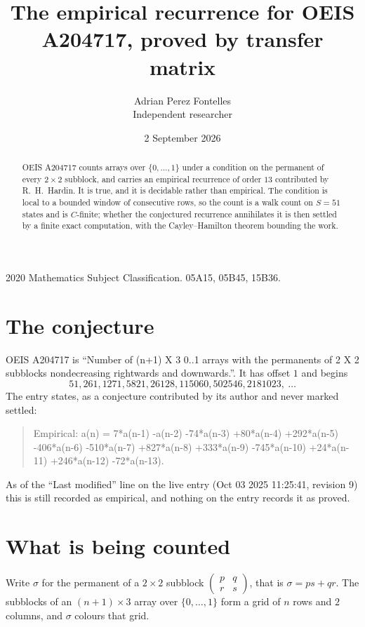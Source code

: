 \documentclass[11pt,a4paper]{article}
\title{The empirical recurrence for OEIS A204717, proved by transfer matrix}
\author{Adrian Perez Fontelles\\ \small Independent researcher}
\date{2 September 2026}
\theoremstyle{plain}
\theoremstyle{definition}
\begin{document}
\maketitle

\begin{abstract}
OEIS A204717 counts arrays over $\{0,\dots,1\}$ under a condition on the permanent of every
$2\times2$ subblock, and carries an empirical recurrence of order $13$ contributed by
R.~H.~Hardin. It is true, and it is decidable rather than empirical. The condition is local to
a bounded window of consecutive rows, so the count is a walk count on $S=51$ states and is
$C$-finite; whether the conjectured recurrence annihilates it is then settled by a finite exact
computation, with the Cayley--Hamilton theorem bounding the work.
\end{abstract}

\noindent\small 2020 Mathematics Subject Classification. 05A15, 05B45, 15B36.\normalsize

\section{The conjecture}

OEIS A204717 is ``Number of (n+1) X 3 0..1 arrays with the permanents of 2 X 2 subblocks nondecreasing rightwards and downwards.''. It has offset $1$ and begins
\[
51, 261, 1271, 5821, 26128, 115060, 502546, 2181023,\ \dots
\]
The entry states, as a conjecture contributed by its author and never marked settled:
\begin{quote}
Empirical: a(n) = 7*a(n-1) -a(n-2) -74*a(n-3) +80*a(n-4) +292*a(n-5) -406*a(n-6) -510*a(n-7) +827*a(n-8) +333*a(n-9) -745*a(n-10) +24*a(n-11) +246*a(n-12) -72*a(n-13).
\end{quote}
As of the ``Last modified'' line on the live entry (Oct 03 2025 11:25:41, revision 9) this is still
recorded as empirical, and nothing on the entry records it as proved.

\section{What is being counted}

Write $\sigma$ for the permanent of a $2\times2$ subblock
$\begin{pmatrix}p&q\\r&s\end{pmatrix}$, that is $\sigma=ps+qr$. The subblocks of an
$(n+1)\times3$ array over $\{0,\dots,1\}$ form a grid of $n$ rows and $2$
columns, and $\sigma$ colours that grid.
\end{document}
